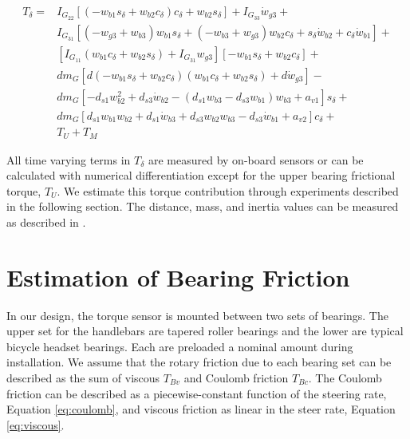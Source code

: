 \documentclass[a4paper]{article}
\begin{document}
\begin{align}
  T_{\delta} =
    & I_{G_{22}} \left[ \left( -w_{b1} s_\delta + w_{b2} c_\delta \right)
      c_\delta + w_{b2} s_\delta \right] + I_{G_{33}} \dot{w}_{g3} + \nonumber \\
    & I_{G_{31}} \left[ (-w_{g3} + w_{b3} ) w_{b1} s_\delta +
      (-w_{b3} + w_{g3}) w_{b2} c_\delta +
      s_\delta \dot{w}_{b2} + c_\delta \dot{w}_{b1} \right] + \nonumber \\
    & \left[ I_{G_{11}} (w_{b1} c_\delta + w_{b2}s_\delta) +
      I_{G_{31}} w_{g3} \right] \left[-w_{b1} s_\delta +
      w_{b2} c_\delta \right] + \nonumber \\
    & d m_G \left[ d (-w_{b1} s_\delta + w_{b2} c_\delta)
      (w_{b1} c_\delta + w_{b2} s_\delta) + d \dot{w}_{g3} \right] - \nonumber \\
    & d m_G \left[-d_{s1} w_{b2}^{2} + d_{s3} \dot{w}_{b2} -
      (d_{s1} w_{b3} - d_{s3} w_{b1}) w_{b3} + a_{v1} \right] s_\delta + \nonumber \\
    & d m_G \left[d_{s1} w_{b1} w_{b2} + d_{s1} \dot{w}_{b3} +
      d_{s3} w_{b2} w_{b3} - d_{s3} \dot{w}_{b1} + a_{v2} \right]
      c_\delta + \nonumber \\
    & T_U + T_M
\end{align}

All time varying terms in $T_\delta$ are measured by on-board
sensors or can be calculated with numerical differentiation except for the
upper bearing frictional torque, $T_U$. We estimate this torque contribution
through experiments described in the following section. The distance, mass, and
inertia values can be measured as described in \cite{Moore2012}.

\section*{Estimation of Bearing Friction}
\label{sec:bearing-friction}

In our design, the torque sensor is mounted between two sets of bearings. The
upper set for the handlebars are tapered roller bearings and the lower are
typical bicycle headset bearings. Each are preloaded a nominal amount during
installation. We assume that the rotary friction due to each bearing set can be
described as the sum of viscous $T_{Bv}$ and Coulomb friction $T_{Bc}$. The
Coulomb friction can be described as a piecewise-constant function of the steering rate,
Equation \ref{eq:coulomb}, and viscous friction as linear in the
steer rate, Equation \ref{eq:viscous}.
\end{document}
